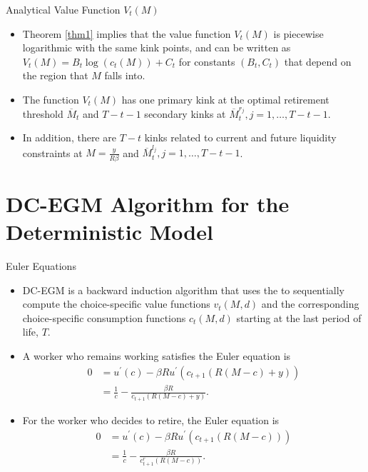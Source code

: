 \documentclass[aspectratio=169]{beamer}
\newcommand{\highlight}[1]{{\color{blue}{#1}}}
\begin{document}
\begin{frame}{Analytical Value Function $V_t(M)$}

	\begin{itemize}
		\item Theorem \ref{thm1} implies that the value function $V_t(M)$ is piecewise logarithmic with the same kink points, and can be written as $V_t(M) = B_t \log(c_t (M)) + C_t$ for constants $(B_t, C_t)$ that depend on the region that $M$ falls into.
		\item The function $V_t(M)$ has one primary kink at the optimal retirement threshold $\overline{M}_t$ and $T-t-1$ secondary kinks at $\overline{M}_t^{r_j}, j = 1, \ldots, T-t-1$.
		\item In addition, there are $T-t$ kinks related to current and future liquidity constraints at $M=\frac{y}{R\beta}$ and $\overline{M}_t^{l_j}, j = 1, \ldots, T-t-1$.

	\end{itemize}
	
\end{frame}

\section[DC-EGM without Taste Shocks]{DC-EGM Algorithm for the Deterministic Model}

\begin{frame}{Euler Equations}

	\begin{itemize}
		\item DC-EGM is a backward induction algorithm that uses the \highlight{inverted Euler equation} to sequentially compute the choice-specific value functions $v_t(M, d)$ and the corresponding choice-specific consumption functions $c_t(M, d)$ starting at the last period of life, $T$.
		\item A worker who remains working satisfies the Euler equation is 
		\begin{equation}
			\label{10}
			\begin{aligned}
				0 & =u^{\prime}(c)-\beta R u^{\prime}\left(c_{t+1}(R(M-c)+y)\right) \\
				& =\frac{1}{c}-\frac{\beta R}{c_{t+1}(R(M-c)+y)} .
			\end{aligned}
		\end{equation}
		\item For the worker who decides to retire, the Euler equation is 
		\begin{equation}
			\label{11}
			\begin{aligned}
				0 & =u^{\prime}(c)-\beta R u^{\prime}\left(c_{t+1}(R(M-c))\right) \\
				& =\frac{1}{c}-\frac{\beta R}{c_{t+1}^r(R(M-c))} .
				\end{aligned}
		\end{equation}
		
	\end{itemize}
	
\end{frame}
\end{document}
